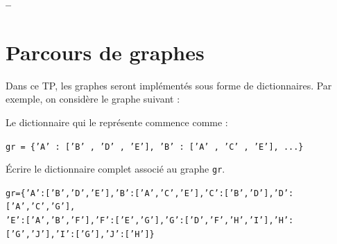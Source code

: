 

\usepackage{tikz}
%




\begin{center}
{\Large\bf {\type} \no {\numero} -- \descrip}
\end{center}


\section{Parcours de graphes}

Dans ce TP, les graphes seront implémentés sous forme de dictionnaires. Par exemple, on considère le graphe suivant : 
\begin{center}
\end{center}
Le dictionnaire qui le représente commence comme : 
\begin{center}
\texttt{gr = \{'A' : ['B' , 'D' , 'E'], 'B' : ['A' , 'C' , 'E'], ...\}}
\end{center}

\begin{exercice}
Écrire le dictionnaire complet associé au graphe \texttt{gr}.
\end{exercice}

\begin{solution}
\texttt{gr=\{'A':['B','D','E'],'B':['A','C','E'],'C':['B','D'],'D':['A','C','G'],}\\
\texttt{'E':['A','B','F'],'F':['E','G'],'G':['D','F','H','I'],'H':['G','J'],'I':['G'],'J':['H']\}}
\end{solution}

